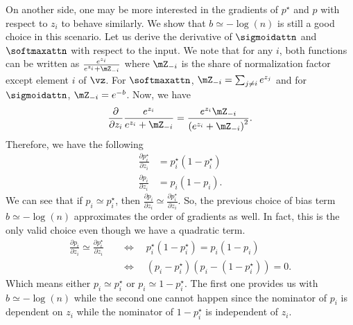 On another side, one may be more interested in the gradients of $p^\star$ and $p$ with respect to $z_i$ to behave similarly. We show that $b \simeq -\log(n)$ is still a good choice in this scenario. Let us derive the derivative of $\sigmoidattn$ and $\softmaxattn$ with respect to the input. We note that for any $i$, both functions can be written as $\frac{e^{z_i}}{e^{z_i} + \mZ_{-i}}$ where $\mZ_{-i}$ is the share of normalization factor except element $i$ of $\vz$. For $\softmaxattn$, $\mZ_{-i} = \sum_{j \neq i} e^{z_j}$ and for $\sigmoidattn$, $\mZ_{-i} = e^{-b}$. Now, we have
\begin{align}
     \frac{\partial}{\partial z_i} \frac{e^{z_i}}{e^{z_i} + \mZ_{-i}} = \frac{e^{z_i}\mZ_{-i}}{\left(e^{z_i} + \mZ_{-i}\right)^2}.
\end{align}
Therefore, we have the following
\begin{align}
    \frac{\partial p_i^\star}{\partial z_i} &= p_i^\star (1-p_i^\star)\\
    \frac{\partial p_i}{\partial z_i} &= p_i (1-p_i).
\end{align}
We can see that if $p_i \simeq p_i^\star$, then $\frac{\partial p_i}{\partial z_i} \simeq \frac{\partial p_i^\star}{\partial z_i}$. So, the previous choice of bias term $b \simeq -\log(n)$ approximates the order of gradients as well. In fact, this is the only valid choice even though we have a quadratic term.
\begin{align}
    \frac{\partial p_i}{\partial z_i} \simeq \frac{\partial p_i^\star}{\partial z_i} &\quad\Longleftrightarrow\quad p_i^\star (1-p_i^\star) = p_i (1-p_i)\\
    &\quad\Longleftrightarrow\quad \left(p_i - p_i^\star\right)\left(p_i - (1-p_i^\star)\right) = 0.
\end{align}
Which means either $p_i \simeq p_i^\star$ or $p_i \simeq 1- p_i^\star$. The first one provides us with $b \simeq -\log(n)$ while the second one cannot happen since the nominator of $p_i$ is dependent on $z_i$ while the nominator of $1-p_i^\star$ is independent of $z_i$.
